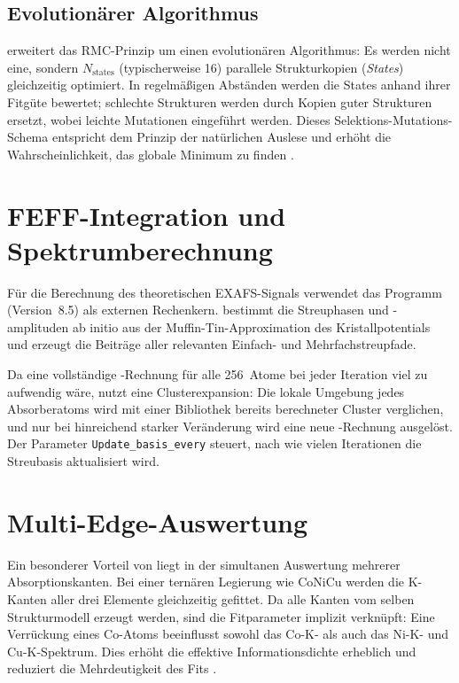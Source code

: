 \subsection{Evolutionärer Algorithmus}

\evax{} erweitert das RMC-Prinzip um einen evolutionären Algorithmus:
Es werden nicht eine, sondern $N_{\text{states}}$ (typischerweise 16)
parallele Strukturkopien (\emph{States}) gleichzeitig optimiert.
In regelmäßigen Abständen werden die States anhand ihrer Fitgüte
bewertet; schlechte Strukturen werden durch Kopien guter Strukturen
ersetzt, wobei leichte Mutationen eingeführt werden.
Dieses Selektions-Mutations-Schema entspricht dem Prinzip der natürlichen
Auslese und erhöht die Wahrscheinlichkeit, das globale Minimum zu finden
\cite{Timoshenko2014}.

\section{FEFF-Integration und Spektrumberechnung}

Für die Berechnung des theoretischen EXAFS-Signals verwendet \evax{}
das Programm \feff{} (Version~8.5) \cite{Rehr2010} als externen
Rechenkern.
\feff{} bestimmt die Streuphasen und -amplituden ab initio aus der
Muffin-Tin-Approximation des Kristallpotentials und erzeugt die
Beiträge aller relevanten Einfach- und Mehrfachstreupfade.

Da eine vollständige \feff{}-Rechnung für alle 256~Atome bei jeder
Iteration viel zu aufwendig wäre, nutzt \evax{} eine
Clusterexpansion: Die lokale Umgebung jedes Absorberatoms wird mit
einer Bibliothek bereits berechneter Cluster verglichen, und nur bei
hinreichend starker Veränderung wird eine neue \feff{}-Rechnung
ausgelöst.
Der Parameter \texttt{Update\_basis\_every} steuert, nach wie vielen
Iterationen die Streubasis aktualisiert wird.

\section{Multi-Edge-Auswertung}

Ein besonderer Vorteil von \evax{} liegt in der simultanen Auswertung
mehrerer Absorptionskanten.
Bei einer ternären Legierung wie CoNiCu werden die K-Kanten aller drei
Elemente gleichzeitig gefittet.
Da alle Kanten vom selben Strukturmodell erzeugt werden, sind die
Fitparameter implizit verknüpft: Eine Verrückung eines Co-Atoms
beeinflusst sowohl das Co-K- als auch das Ni-K- und Cu-K-Spektrum.
Dies erhöht die effektive Informationsdichte erheblich und reduziert
die Mehrdeutigkeit des Fits \cite{Timoshenko2012a}.

